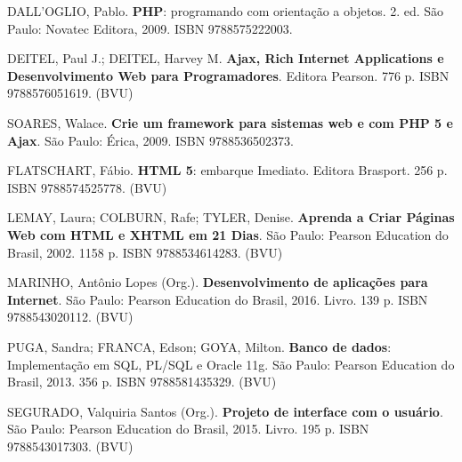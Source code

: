 \begin{pud}
	\begin{bibbasica}
			
        \item DALL'OGLIO, Pablo. \textbf{PHP}: programando com orientação a objetos. 2. ed. São Paulo: Novatec Editora, 2009.  ISBN 9788575222003.
		\item DEITEL, Paul J.; DEITEL, Harvey M.  \textbf{Ajax, Rich Internet Applications e Desenvolvimento Web para Programadores}. Editora Pearson. 776 p. ISBN 9788576051619. (BVU)
		\item SOARES, Walace. \textbf{Crie um framework para sistemas web e com PHP 5 e Ajax}. São Paulo: Érica, 2009.  ISBN 9788536502373.
		
	\end{bibbasica}
	
	\begin{bibcomplementar}
    
	    
		\item FLATSCHART, F\'abio. \textbf{HTML 5}: embarque Imediato. Editora Brasport. 256 p. ISBN 9788574525778. (BVU)
		\item LEMAY, Laura; COLBURN, Rafe; TYLER, Denise. \textbf{Aprenda a Criar P\'aginas Web com HTML e XHTML em 21 Dias}. São Paulo: Pearson Education do Brasil, 2002.  1158 p. ISBN 9788534614283. (BVU)
 		\item MARINHO, Antônio Lopes (Org.). \textbf{Desenvolvimento de aplicações para Internet}. São Paulo: Pearson Education do Brasil, 2016. Livro. 139 p. ISBN 9788543020112. (BVU)
 		
 		\item PUGA, Sandra; FRANCA, Edson; GOYA, Milton. \textbf{Banco de dados}: Implementa\c{c}\~ao em SQL, PL/SQL e Oracle 11g.  São Paulo: Pearson Education do Brasil, 2013. 356 p.  ISBN 9788581435329. (BVU)
 		\item SEGURADO, Valquiria Santos (Org.). \textbf{Projeto de interface com o usuário}. São Paulo: Pearson Education do Brasil, 2015. Livro. 195 p. ISBN 9788543017303. (BVU) 
		 
	\end{bibcomplementar}
	

\end{pud}



